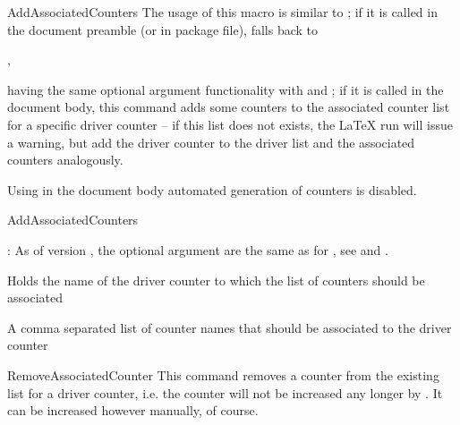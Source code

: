 \documentclass[12pt,a4paper,oneside]{article}
\def\packageversion{\xassoccntpackageversion}%
\begin{document}
\begin{docCommand}{AddAssociatedCounters}{}
The usage of this macro is similar to ; if it is called in the document preamble (or in package file),  falls back to 
\begin{center},\end{center} having the same optional argument functionality with  and ; if it is called in the document body, this command adds some counters to the associated counter list for a specific driver counter -- if this list does not exists, the \LaTeX{} run will issue a warning, but add the driver counter to the driver list and the associated counters analogously. 
\marginnote{\bcbombe}

Using  in the document body automated generation of counters is disabled. 



\begin{docCommandArgs}{AddAssociatedCounters}

\begin{codeoptionsenum}
  \item {}: As of version \packageversion, the optional argument  are the same as for , see  and .

  \item {} 

    Holds the name of the driver counter to which the list of counters should be associated
  \item {}

  A comma separated list of counter names that should be associated to the driver counter
\end{codeoptionsenum}
\end{docCommandArgs}



\end{docCommand}%

\begin{docCommand}{RemoveAssociatedCounter}{}
This command removes a counter from the existing list for a driver counter, i.e. the counter will not be increased any longer by . It can be increased however manually, of course. 
\end{docCommand}
\end{document}
